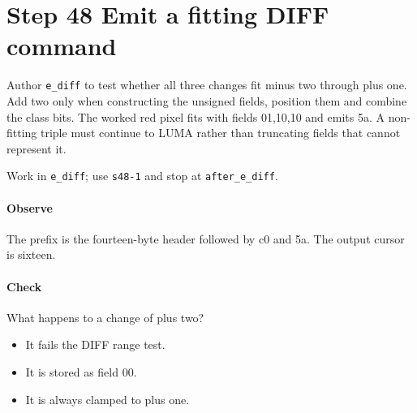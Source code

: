 \section{Step 48 Emit a fitting DIFF command}\label{qoi-s48}
Author \texttt{e\_diff} to test whether all three changes fit minus two through plus one. Add two only when constructing the unsigned fields, position them and combine the class bits. The worked red pixel fits with fields 01,10,10 and emits 5a. A non-fitting triple must continue to LUMA rather than truncating fields that cannot represent it.

Work in \texttt{e\_diff}; use \texttt{s48-1} and stop at \texttt{after\_e\_diff}.

\paragraph{Observe} The prefix is the fourteen-byte header followed by c0 and 5a. The output cursor is sixteen.

\paragraph{Check} What happens to a change of plus two?
\begin{itemize}
  \item[A.] It fails the DIFF range test.
  \item[B.] It is stored as field 00.
  \item[C.] It is always clamped to plus one.
\end{itemize}
